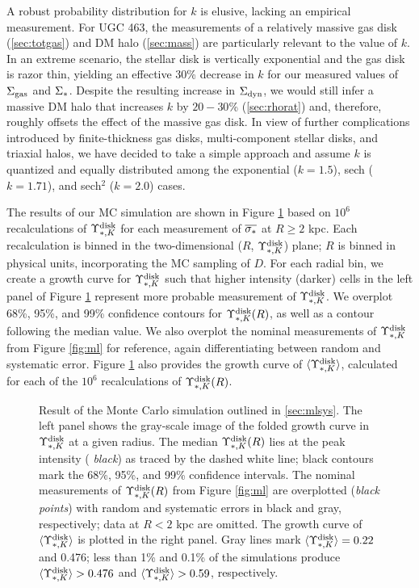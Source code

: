 \documentclass[apj,iop,numberedappendix]{emulateapj}
\begin{document}
A robust probability distribution for $k$ is elusive, lacking an empirical
measurement.  For UGC 463, the measurements of a relatively massive gas disk
(\sect \ref{sec:totgas}) and DM halo (\sect \ref{sec:mass}) are particularly
relevant to the value of $k$.  In an extreme scenario, the stellar disk is
vertically exponential and the gas disk is razor thin, yielding an effective
30\% decrease in $k$ for our measured values of $\Sigma_{\rm gas}$ and $\Sigma_{\rm \ast}$.  Despite the
resulting increase in $\Sigma_{\rm dyn}$, we would still infer a massive DM halo that
increases $k$ by $20 - 30$\% (\sect \ref{sec:rhorat}) and, therefore, roughly
offsets the effect of the massive gas disk.  In view of further complications
introduced by finite-thickness gas disks, multi-component stellar disks, and
triaxial halos, we have decided to take a simple approach and assume $k$ is
quantized and equally distributed among the exponential ($k = 1.5$), sech
($k=1.71$), and sech$^2$ ($k=2.0$) cases.

The results of our MC simulation are shown in Figure \ref{fig:mlrsim} based on
$10^6$ recalculations of $\Upsilon_{\ast,K}^{\rm disk}$ for each measurement of $\overline{\sigma_{\ast}}$
at $R\geq2$ kpc.  Each recalculation is binned in the two-dimensional ($R$,
$\Upsilon_{\ast,K}^{\rm disk}$) plane; $R$ is binned in physical units, incorporating the MC
sampling of $D$.  For each radial bin, we create a growth curve for $\Upsilon_{\ast,K}^{\rm disk}$
such that higher intensity (darker) cells in the left panel of Figure
\ref{fig:mlrsim} represent more probable measurement of $\Upsilon_{\ast,K}^{\rm disk}$.  We
overplot 68\%, 95\%, and 99\% confidence contours for $\Upsilon_{\ast,K}^{\rm disk}(R)$, as well as
a contour following the median value.  We also overplot the nominal measurements
of $\Upsilon_{\ast,K}^{\rm disk}$ from Figure \ref{fig:ml} for reference, again differentiating
between random and systematic error.  Figure \ref{fig:mlrsim} also provides the
growth curve of $\langle \Upsilon_{\ast,K}^{\rm disk} \rangle$, calculated for each of the $10^6$
recalculations of $\Upsilon_{\ast,K}^{\rm disk}(R)$.

\begin{figure}
\caption{
%
Result of the Monte Carlo simulation outlined in \sect \ref{sec:mlsys}.  The
left panel shows the gray-scale image of the folded growth curve in $\Upsilon_{\ast,K}^{\rm disk}$
at a given radius. The median $\Upsilon_{\ast,K}^{\rm disk}(R)$ lies at the peak intensity ({\it
black}) as traced by the dashed white line; black contours mark the 68\%, 95\%,
and 99\% confidence intervals.  The nominal measurements of $\Upsilon_{\ast,K}^{\rm disk}(R)$ from
Figure \ref{fig:ml} are overplotted ({\it black points}) with random and
systematic errors in black and gray, respectively; data at $R<2$ kpc are
omitted.  The growth curve of $\langle \Upsilon_{\ast,K}^{\rm disk} \rangle$ is plotted in the right
panel. Gray lines mark $\langle \Upsilon_{\ast,K}^{\rm disk} \rangle = 0.22$ and 0.476; less than 1\% and
0.1\% of the simulations produce $\langle \Upsilon_{\ast,K}^{\rm disk} \rangle > 0.476$ and
$\langle \Upsilon_{\ast,K}^{\rm disk} \rangle > 0.59$, respectively.
%
}
\label{fig:mlrsim}
\end{figure}
\end{document}
